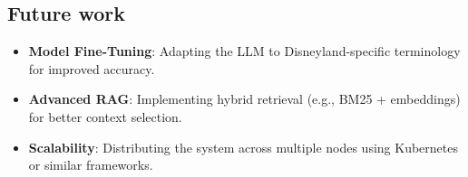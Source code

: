 \documentclass[11pt]{article}
\begin{document}
\subsection{Future work}
\begin{itemize}
    \item \textbf{Model Fine-Tuning}: Adapting the LLM to Disneyland-specific terminology for improved accuracy.
    \item \textbf{Advanced RAG}: Implementing hybrid retrieval (e.g., BM25 + embeddings) for better context selection.
    \item \textbf{Scalability}: Distributing the system across multiple nodes using Kubernetes or similar frameworks.
\end{itemize}

\newpage
\singlespacing

{} 

\end{document}
